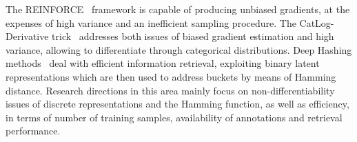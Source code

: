 The REINFORCE~\cite{williams1992simple} framework is capable of producing unbiased gradients, at the expenses of high variance and an inefficient sampling procedure.
The CatLog-Derivative trick~\cite{de2023differentiable} addresses both issues of biased gradient estimation and high variance, allowing to differentiate through categorical distributions.
%
%
Deep Hashing methods~\cite{luo2020survey} deal with efficient information retrieval, exploiting binary latent representations which are then used to address buckets by means of Hamming distance. Research directions in this area mainly focus on non-differentiability issues of discrete representations and the Hamming function, as well as efficiency, in terms of number of training samples, availability of annotations and retrieval performance.
%
%
